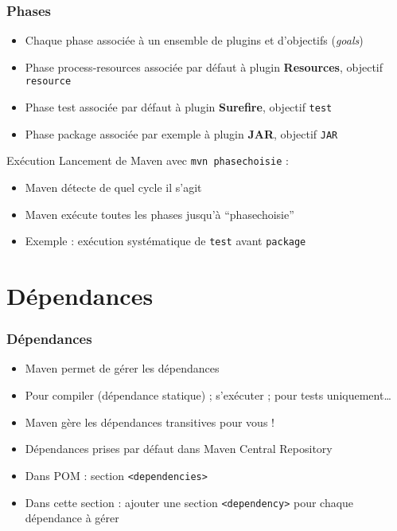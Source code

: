 \documentclass[english, french]{beamer}
\begin{document}
\begin{frame}
	\frametitle{Phases}
	\begin{itemize}
		\item Chaque phase associée à un ensemble de plugins et d’objectifs (\emph{goals})
		\item Phase process-resources associée {\tiny par défaut} à plugin \textbf{Resources}, objectif \texttt{resource}
		\item Phase test associée {\tiny par défaut} à plugin \textbf{Surefire}, objectif \texttt{test}
		\item Phase package associée {\tiny par exemple} à plugin \textbf{JAR}, objectif \texttt{JAR}
	\end{itemize}
	\begin{block}{Exécution}
		Lancement de Maven avec \texttt{mvn phasechoisie} :
		\begin{itemize}
			\item Maven détecte de quel cycle il s’agit
			\item Maven exécute toutes les phases jusqu’à “phasechoisie”
			\item Exemple : exécution systématique de \texttt{test} avant \texttt{package}
		\end{itemize}
	\end{block}
\end{frame}

\section{Dépendances}
\begin{frame}
	\frametitle{Dépendances}
	\begin{itemize}
		\item Maven permet de gérer les \og{}dépendances\fg{}
		\item Pour compiler (dépendance statique) ; s’exécuter ; pour tests uniquement…
		\item Maven gère les dépendances transitives pour vous !
		\item Dépendances prises {\tiny par défaut} dans Maven Central Repository
		\item Dans POM : section \texttt{<dependencies>}
		\item Dans cette section : ajouter une section \texttt{<dependency>} pour chaque dépendance à gérer
	\end{itemize}
\end{frame}
\end{document}
